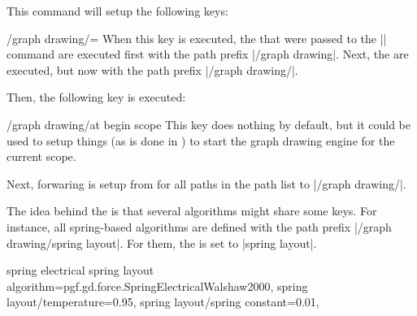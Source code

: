 \begin{command}{\pgfgddeclarealgorithmkey{}}
  This command will setup the following keys:
  
  \begin{key}{/graph drawing/=}
    When this key is executed, the  that were passed to
    the |\pgfgddeclarealgorithmkey| command are executed first with
    the path prefix |/graph drawing|. Next, the 
    are executed, but now with the path prefix
    |/graph drawing/|.

    Then, the following key is executed:
    \begin{key}{/graph drawing/at begin scope}
      This key does nothing by default, but it could be used to setup
      things (as is done in \tikzname) to start the graph drawing
      engine for the current scope. 
    \end{key}
  \end{key}

  Next, forwaring is setup from  for all paths in
  the path list to |/graph drawing/|.
  
  The idea behind the  is that several
  algorithms might share some keys. For
  instance, all spring-based algorithms are defined with the path
  prefix |/graph drawing/spring layout|. For them, the
   is set to |spring layout|.
\begin{codeexample}
\pgfgddeclarealgorithmkey
  {spring electrical}
  {spring layout}
  {
    algorithm=pgf.gd.force.SpringElectricalWalshaw2000,
    spring layout/temperature=0.95,
    spring layout/spring constant=0.01,
  }    
\end{codeexample}
\end{command}  



